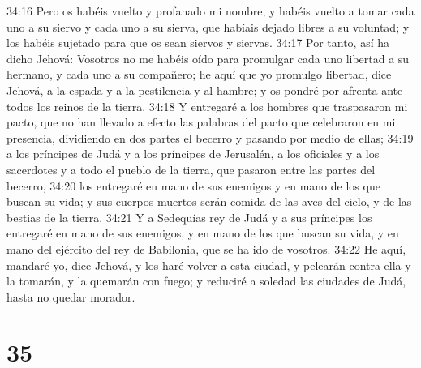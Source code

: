 34:16 Pero os habéis vuelto y profanado mi nombre, y habéis vuelto a tomar cada uno a su siervo y cada uno a su sierva, que habíais dejado libres a su voluntad; y los habéis sujetado para que os sean siervos y siervas.  
34:17 Por tanto, así ha dicho Jehová: Vosotros no me habéis oído para promulgar cada uno libertad a su hermano, y cada uno a su compañero; he aquí que yo promulgo libertad, dice Jehová, a la espada y a la pestilencia y al hambre; y os pondré por afrenta ante todos los reinos de la tierra.  
34:18 Y entregaré a los hombres que traspasaron mi pacto, que no han llevado a efecto las palabras del pacto que celebraron en mi presencia, dividiendo en dos partes el becerro y pasando por medio de ellas;  
34:19 a los príncipes de Judá y a los príncipes de Jerusalén, a los oficiales y a los sacerdotes y a todo el pueblo de la tierra, que pasaron entre las partes del becerro,  
34:20 los entregaré en mano de sus enemigos y en mano de los que buscan su vida; y sus cuerpos muertos serán comida de las aves del cielo, y de las bestias de la tierra.  
34:21 Y a Sedequías rey de Judá y a sus príncipes los entregaré en mano de sus enemigos, y en mano de los que buscan su vida, y en mano del ejército del rey de Babilonia, que se ha ido de vosotros.  
34:22 He aquí, mandaré yo, dice Jehová, y los haré volver a esta ciudad, y pelearán contra ella y la tomarán, y la quemarán con fuego; y reduciré a soledad las ciudades de Judá, hasta no quedar morador.  
  

\chapter{35}

